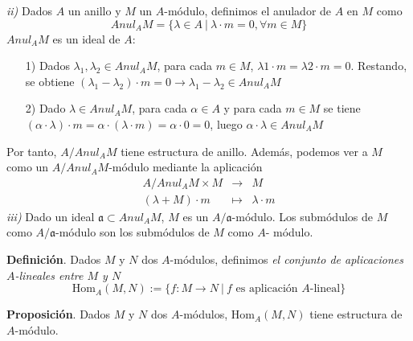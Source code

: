 \documentclass[a4paper,12pt]{article}
\newcommand{\Hom}{\text{Hom}}
\begin{document}
\textit{ii)} Dados $A$ un anillo y $M$ un $A$-módulo, definimos el anulador de $A$ en $M$ como$$Anul_A M = \{\lambda\in A\ |\  \lambda\cdot m=0, \forall m\in M\}$$
$Anul_A M$ es un ideal de $A$:
\begin{itemize}
     \item[1)]Dados $\lambda_1, \lambda_2\in Anul_A M$, para cada $m\in M$, $\lambda1\cdot m=\lambda2\cdot m=0$. Restando, se obtiene $(\lambda_1-\lambda_2)\cdot m=0 \rightarrow \lambda_1 -\lambda_2\in Anul_A M$
     \item[2)]Dado $\lambda\in Anul_AM$, para cada $\alpha\in A$ y para cada $m\in M$ se tiene $(\alpha\cdot\lambda)\cdot m=\alpha\cdot(\lambda\cdot m) =\alpha\cdot 0=0$, luego $\alpha\cdot\lambda\in Anul_AM$
\end{itemize}
Por tanto, $A/Anul_AM$ tiene estructura de anillo. Además, podemos ver a $M$ como un $A/Anul_AM$-módulo mediante la aplicación
$$\begin{array}{rcl}
    A/Anul_AM\times M&\longrightarrow&M\\
    (\lambda + M)\cdot m&\longmapsto&\lambda\cdot m
\end{array}$$
\textit{iii)} Dado un ideal $\mathfrak{a}\subset Anul_AM$, $M$ es un $A/\mathfrak{a}$-módulo. Los submódulos de $M$ como $A/\mathfrak{a}$-módulo son los submódulos de $M$ como $A$- módulo.

\textbf{Definición}. Dados $M$ y $N$ dos $A$-módulos, definimos \textit{el conjunto de aplicaciones $A$-lineales entre $M$ y $N$}
$$\Hom_A(M,N):=\{f:M\longrightarrow N\ |\ f\text{ es aplicación }A\text{-lineal}\}
$$

\textbf{Proposición}. Dados $M$ y $N$ dos $A$-módulos, $\Hom_A(M,N)$ tiene estructura de $A$-módulo.
\end{document}
